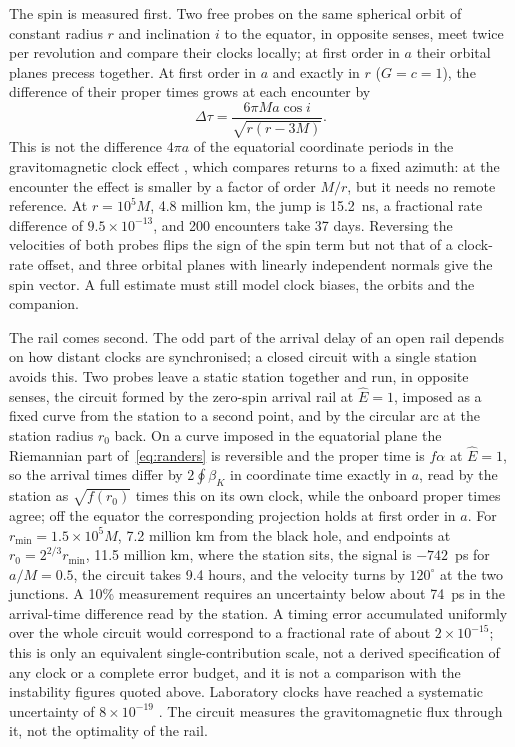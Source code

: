 \documentclass[12pt]{iopart}
\theoremstyle{plain}
\theoremstyle{definition}
\theoremstyle{remark}
\newcommand{\Ehat}{\hat E}
\begin{document}
The spin is measured first. Two free probes on the same spherical orbit of constant radius
$r$ and inclination $i$ to the equator, in opposite senses, meet twice per revolution and
compare their clocks locally; at first order in $a$ their orbital planes precess together. At
first order in $a$ and exactly in $r$ ($G=c=1$), the difference of their proper times grows
at each encounter by
\begin{equation}
    \Delta\tau=\frac{6\pi Ma\cos i}{\sqrt{r(r-3M)}} .
    \label{eq:encounter-clock}
\end{equation}
This is not the difference $4\pi a$ of the equatorial coordinate periods in the
gravitomagnetic clock effect \cite{MashhoonGronwaldLichtenegger2001}, which compares returns
to a fixed azimuth: at the encounter the effect is smaller by a factor of order $M/r$, but it
needs no remote reference. At $r=10^5M$, 4.8 million km, the jump is 15.2~ns, a fractional
rate difference of $9.5\times10^{-13}$, and 200 encounters take 37 days. Reversing the
velocities of both probes flips the sign of the spin term but not that of a clock-rate
offset, and three orbital planes with linearly independent normals give the spin vector. A
full estimate must still model clock biases, the orbits and the companion.

The rail comes second. The odd part of the arrival delay of an open rail depends on how
distant clocks are synchronised; a closed circuit with a single station avoids this. Two
probes leave a static station together and run, in opposite senses, the circuit formed by
the zero-spin arrival rail at $\Ehat=1$, imposed as a fixed curve from the station to a
second point, and by the circular arc at the station radius $r_0$ back. On a curve imposed
in the equatorial plane the Riemannian part of~\eqref{eq:randers} is reversible and the
proper time is $f\alpha$ at $\Ehat=1$, so the arrival times differ by $2\oint\beta_K$ in
coordinate time exactly in $a$, read by the station as $\sqrt{f(r_0)}$ times this on its own
clock, while the onboard proper times agree; off the equator the corresponding projection
holds at first order in $a$. For $r_{\min}=1.5\times10^5M$, 7.2 million km from the black
hole, and endpoints at $r_0=2^{2/3}r_{\min}$, 11.5 million km, where the station sits, the
signal is $-742$~ps for $a/M=0.5$, the circuit takes 9.4 hours, and the velocity turns by
$120^\circ$ at the two junctions. A 10\% measurement requires an uncertainty below about
74~ps in the arrival-time difference read by the station. A timing error accumulated
uniformly over the whole circuit would correspond to a fractional rate of about
$2\times10^{-15}$; this is only an equivalent single-contribution scale, not a derived
specification of any clock or a complete error budget, and it is not a comparison with the
instability figures quoted above. Laboratory clocks have reached a systematic uncertainty of
$8\times10^{-19}$ \cite{Aeppli2024}. The circuit measures the gravitomagnetic flux through it,
not the optimality of the rail.
\end{document}
